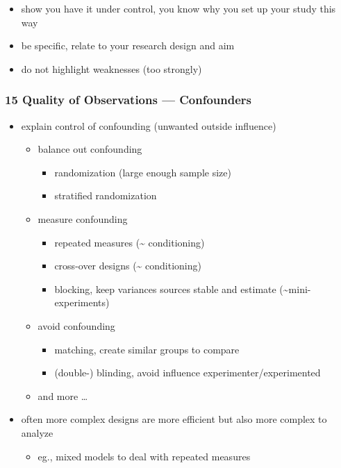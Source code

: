 \documentclass[
]{article}
\providecommand{\tightlist}{%
  \setlength{\itemsep}{0pt}\setlength{\parskip}{0pt}}
\begin{document}
\begin{itemize}
  \begin{itemize}
  \tightlist
  \item
    show you have it under control, you know why you set up your study
    this way
  \item
    be specific, relate to your research design and aim
  \item
    do not highlight weaknesses (too strongly)
  \end{itemize}
\end{itemize}

\hypertarget{quality-of-observations-confounders}{%
\subsubsection{15 Quality of Observations ---
Confounders}\label{quality-of-observations-confounders}}

\begin{itemize}
\tightlist
\item
  explain control of confounding (unwanted outside influence)

  \begin{itemize}
  \tightlist
  \item
    balance out confounding

    \begin{itemize}
    \tightlist
    \item
      randomization (large enough sample size)
    \item
      stratified randomization
    \end{itemize}
  \item
    measure confounding

    \begin{itemize}
    \tightlist
    \item
      repeated measures (\textasciitilde{} conditioning)
    \item
      cross-over designs (\textasciitilde{} conditioning)
    \item
      blocking, keep variances sources stable and estimate
      (\textasciitilde mini-experiments)
    \end{itemize}
  \item
    avoid confounding

    \begin{itemize}
    \tightlist
    \item
      matching, create similar groups to compare
    \item
      (double-) blinding, avoid influence experimenter/experimented
    \end{itemize}
  \item
    and more \ldots{} \\
  \end{itemize}
\item
  often more complex designs are more efficient but also more complex to
  analyze

  \begin{itemize}
  \tightlist
  \item
    eg., mixed models to deal with repeated measures
  \end{itemize}
\end{itemize}
\end{document}
